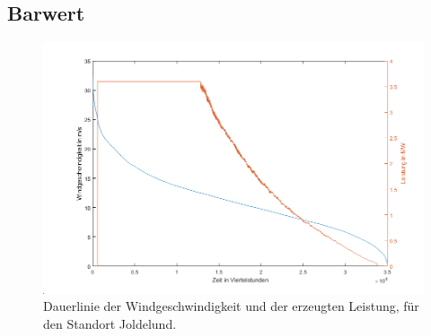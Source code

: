 \documentclass[a4paper,12pt]{article}
\begin{document}
	\subsection{Barwert}
	\begin{figure}[H]
		\centering
		\includegraphics[width=12cm]{img/results/Dauerlinie_Onshore}
		\caption{Dauerlinie der Windgeschwindigkeit und der erzeugten Leistung, für den Standort Joldelund.}
	\end{figure}
\end{document}
